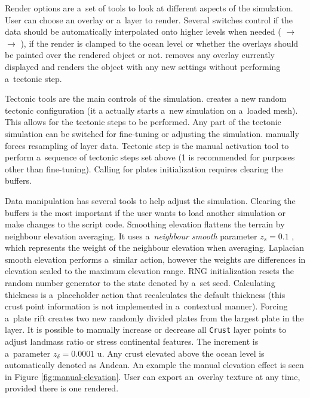 Render options are a~set of tools to look at different aspects of the simulation. User can choose an overlay or a~layer to render. Several switches control if the data should be automatically interpolated onto higher levels when needed ( $\rightarrow$  $\rightarrow$ ), if the render is clamped to the ocean level or whether the overlays should be painted over the rendered object or not.  removes any overlay currently displayed and  renders the object with any new settings without performing a~tectonic step.

Tectonic tools are the main controls of the simulation.  creates a new random tectonic configuration (it a actually starts a~new simulation on a~loaded mesh). This allows for the tectonic steps to be performed. Any part of the tectonic simulation can be switched for fine-tuning or adjusting the simulation.  manually forces resampling of  layer data. Tectonic step is the manual activation tool to perform a~sequence of tectonic steps set above (1 is recommended for purposes other than fine-tuning). Calling for plates initialization requires clearing the buffers.

Data manipulation has several tools to help adjust the simulation. Clearing the buffers is the most important if the user wants to load another simulation or make changes to the script code. Smoothing elevation flattens the terrain by neighbour elevation averaging. It uses a~\textit{neighbour smooth} parameter $z_s=0.1$ , which represents the weight of the neighbour elevation when averaging. Laplacian smooth elevation performs a~similar action, however the weights are differences in elevation scaled to the maximum elevation range. RNG initialization resets the random number generator to the state denoted by a~set seed. Calculating thickness is a~placeholder action that recalculates the default thickness (this crust point information is not implemented in a~contextual manner). Forcing a~plate rift creates two new randomly divided plates from the largest plate in the  layer. It is possible to manually increase or decrease all \texttt{Crust} layer points to adjust landmass ratio or stress continental features. The increment is a~parameter $z_\delta=0.0001\mbox{ u}$. Any crust elevated above the ocean level is automatically denoted as Andean. An example the manual elevation effect is seen in Figure \ref{fig:manual-elevation}. User can export an~overlay texture at any time, provided there is one rendered.

